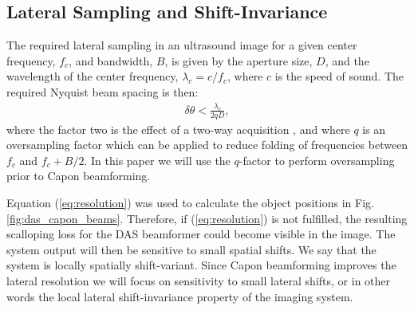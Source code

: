 \documentclass[draftcls]{IEEEtran}
\newcommand{\mat}[1]{\mathbf{#1}}
\renewcommand{\vec}[1]{\mathbf{#1}}
\begin{document}

\subsection{Lateral Sampling and Shift-Invariance}

The required lateral sampling in an ultrasound image for a given center frequency, $f_c$, and bandwidth, $B$, is given by the aperture size, $D$, and the wavelength of the center frequency, $\lambda_c = c/f_c$, where $c$ is the speed of sound. The required Nyquist beam spacing is then:
\begin{align}
\delta\theta < \frac{\lambda_c}{2qD}, \label{eq:resolution}
\end{align}
where the factor two is the effect of a two-way acquisition \cite{Hergum2009}, and where $q$ is an oversampling factor which can be applied to reduce folding of frequencies between $f_c$ and $f_c + B/2$. In this paper we will use the $q$-factor to perform oversampling prior to Capon beamforming.

Equation (\ref{eq:resolution}) was used to calculate the object positions in Fig.\,\ref{fig:das_capon_beams}. Therefore, if (\ref{eq:resolution}) is not fulfilled, the resulting scalloping loss for the DAS beamformer could become visible in the image. The system output will then be sensitive to small spatial shifts. We say that the system is locally spatially shift-variant. Since Capon beamforming improves the lateral resolution we will focus on sensitivity to small lateral shifts, or in other words the local lateral shift-invariance property of the imaging system.%
\end{document}
